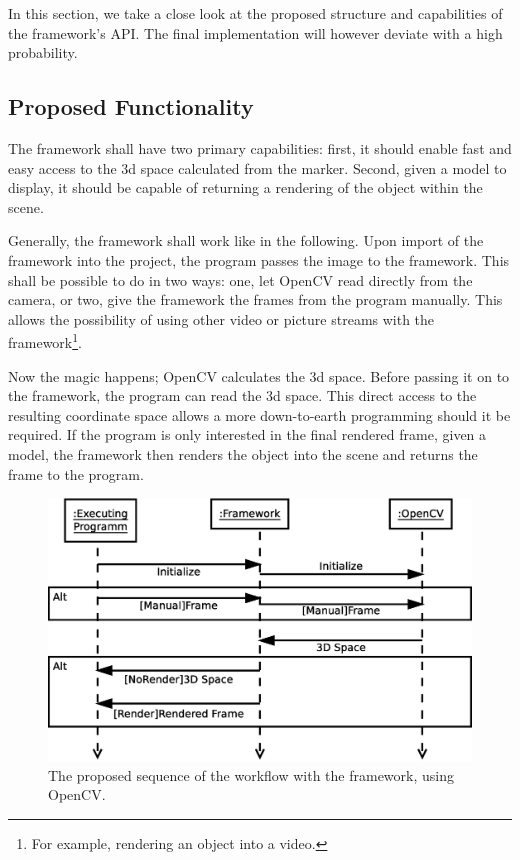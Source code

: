 In this section, we take a close look at the proposed structure and capabilities of the framework's API.
The final implementation will however deviate with a high probability.

\subsection{Proposed Functionality}

The framework shall have two primary capabilities: first, it should enable fast and easy access to the 3d space calculated from the marker.
Second, given a model to display, it should be capable of returning a rendering of the object within the scene.

Generally, the framework shall work like in the following.
Upon import of the framework into the project, the program passes the image to the framework.
This shall be possible to do in two ways: one, let OpenCV read directly from the camera, or two, give the framework the frames from the program manually.
This allows the possibility of using other video or picture streams with the framework\footnote{For example, rendering an object into a video.}.

Now the magic happens; OpenCV calculates the 3d space.
Before passing it on to the framework, the program can read the 3d space.
This direct access to the resulting coordinate space allows a more down-to-earth programming should it be required.
If the program is only interested in the final rendered frame, given a model, the framework then renders the object into the scene and returns the frame to the program.

\begin{figure}
	\centering
	\includegraphics[width=12cm]{images/sequence_access.eps}
	\caption[Access Sequence.]{The proposed sequence of the workflow with the framework, using OpenCV.}
	\label{fig:sequence_access}
\end{figure}

